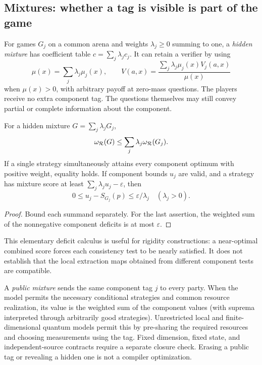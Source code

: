 \subsection{Mixtures: whether a tag is visible is part of the game}
For games $G_j$ on a common arena and weights $\lambda_j\geq0$ summing to one,
a \emph{hidden mixture} has coefficient table
$c=\sum_j\lambda_j c_j$. It can retain a verifier by using
\[
 \mu(x)=\sum_j\lambda_j\mu_j(x),\qquad
 V(a,x)=\frac{\sum_j\lambda_j\mu_j(x)V_j(a,x)}{\mu(x)}
\]
when $\mu(x)>0$, with arbitrary payoff at zero-mass questions. The players
receive no extra component tag. The questions themselves may still convey
partial or complete information about the component.

\begin{proposition}
For a hidden mixture $G=\sum_j\lambda_jG_j$,
\begin{equation}
 \omega_{\mathcal R}(G)\leq\sum_j\lambda_j\omega_{\mathcal R}(G_j).
 \label{eq:mixture}
\end{equation}
If a single strategy simultaneously attains every component optimum with
positive weight, equality holds. If component bounds $u_j$ are valid, and a
strategy has mixture score at least $\sum_j\lambda_j u_j-\varepsilon$, then
\[
 0\leq u_j-S_{G_j}(p)\leq\varepsilon/\lambda_j
 \quad(\lambda_j>0).
\]
\end{proposition}
\begin{proof}
Bound each summand separately. For the last assertion, the weighted sum of
the nonnegative component deficits is at most $\varepsilon$.
\end{proof}
This elementary deficit calculus is useful for rigidity constructions: a
near-optimal combined score forces each consistency test to be nearly
satisfied. It does not establish that the local extraction maps obtained from
different component tests are compatible.

A \emph{public mixture} sends the same component tag $j$ to every party. When
the model permits the necessary conditional strategies and common resource
realization, its value is the weighted sum of the component values (with
suprema interpreted through arbitrarily good strategies). Unrestricted local
and finite-dimensional quantum models permit this by pre-sharing the required
resources and choosing measurements using the tag. Fixed dimension, fixed
state, and independent-source contracts require a separate closure check.
Erasing a public tag or revealing a hidden one is not a compiler optimization.

